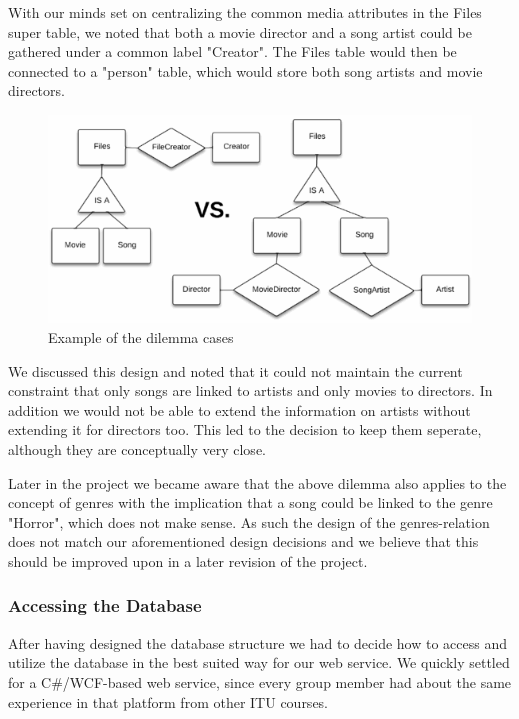 With our minds set on centralizing the common media attributes in the Files super table, we noted that both a movie director and a song artist could be gathered under a common label "Creator". The Files table would then be connected to a "person" table, which would store both song artists and movie directors.
\begin{figure}[hbt]
	\centering
	\centerline{\includegraphics{./p1design/dilemma.png}}
	\caption{Example of the dilemma cases}
	\label{fig:erddilemma}
\end{figure}

We discussed this design and noted that it could not maintain the current constraint that only songs are linked to artists and only movies to directors. In addition we would not be able to extend the information on artists without extending it for directors too. This led to the decision to keep them seperate, although they are conceptually very close.

Later in the project we became aware that the above dilemma also applies to the concept of genres with the implication that a song could be linked to the genre "Horror", which does not make sense. As such the design of the genres-relation does not match our aforementioned design decisions and we believe that this should be improved upon in a later revision of the project.

\subsubsection{Accessing the Database}
\label{sec:databaseaccess}
After having designed the database structure we had to decide how to access and utilize the database in the best suited way for our web service. We quickly settled for a C\#/WCF-based web service, since every group member had about the same experience in that platform from other ITU courses.

